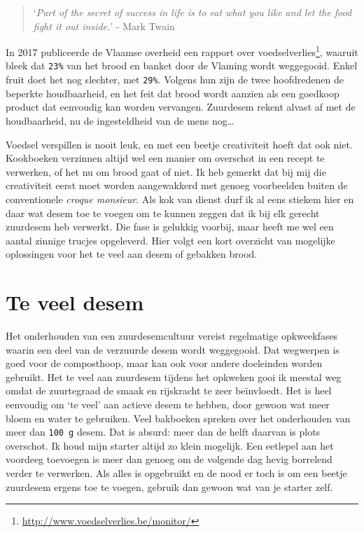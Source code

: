 \documentclass[
  11pt,
  dutch,
]{memoir}
\begin{document}
\begin{quote}
`\emph{Part of the secret of success in life is to eat what you like and
let the food fight it out inside.}' - Mark Twain
\end{quote}

In 2017 publiceerde de Vlaamse overheid een rapport over
voedselverlies\footnote{\url{http://www.voedselverlies.be/monitor/}},
waaruit bleek dat \texttt{23\%} van het brood en banket door de Vlaming
wordt weggegooid. Enkel fruit doet het nog slechter, met \texttt{29\%}.
Volgens hun zijn de twee hoofdredenen de beperkte houdbaarheid, en het
feit dat brood wordt aanzien als een goedkoop product dat eenvoudig kan
worden vervangen. Zuurdesem rekent alvast af met de houdbaarheid, nu de
ingesteldheid van de mens nog\ldots{}

Voedsel verspillen is nooit leuk, en met een beetje creativiteit hoeft
dat ook niet. Kookboeken verzinnen altijd wel een manier om overschot in
een recept te verwerken, of het nu om brood gaat of niet. Ik heb gemerkt
dat bij mij die creativiteit eerst moet worden aangewakkerd met genoeg
voorbeelden buiten de conventionele \emph{croque monsieur}. Als kok van
dienst durf ik al eens stiekem hier en daar wat desem toe te voegen om
te kunnen zeggen dat ik bij elk gerecht zuurdesem heb verwerkt. Die fase
is gelukkig voorbij, maar heeft me wel een aantal zinnige trucjes
opgeleverd. Hier volgt een kort overzicht van mogelijke oplossingen voor
het te veel aan desem of gebakken brood.

\hypertarget{te-veel-desem}{%
\section{Te veel desem}\label{te-veel-desem}}

Het onderhouden van een zuurdesemcultuur vereist regelmatige
opkweekfases waarin een deel van de verzuurde desem wordt weggegooid.
Dat wegwerpen is goed voor de composthoop, maar kan ook voor andere
doeleinden worden gebruikt. Het te veel aan zuurdesem tijdens het
opkweken gooi ik meestal weg omdat de zuurtegraad de smaak en rijskracht
te zeer beïnvloedt. Het is heel eenvoudig om `te veel' aan actieve desem
te hebben, door gewoon wat meer bloem en water te gebruiken. Veel
bakboeken spreken over het onderhouden van meer dan \texttt{100\ g}
desem. Dat is absurd: meer dan de helft daarvan is plots overschot. Ik
houd mijn starter altijd zo klein mogelijk. Een eetlepel aan het
voordeeg toevoegen is meer dan genoeg om de volgende dag hevig borrelend
verder te verwerken. Als alles is opgebruikt en de nood er toch is om
een beetje zuurdesem ergens toe te voegen, gebruik dan gewoon wat van je
starter zelf.
\end{document}
